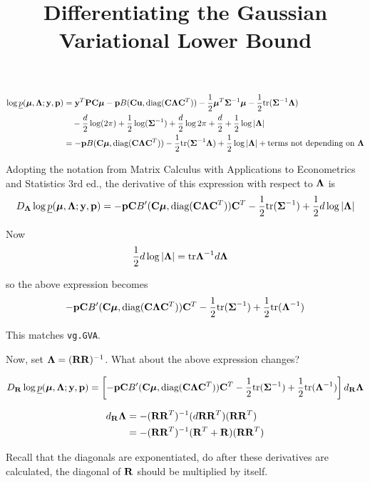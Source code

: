 \documentclass{article}[12pt]
\title{Differentiating the Gaussian Variational Lower Bound}
\begin{document}
\begin{align*}
\log \underline{p}({\boldsymbol \mu}, {\boldsymbol \Lambda}; {\bf y}, {\bf p}) &= {\bf y}^T {\bf P} {\bf C} {\boldsymbol \mu} - {\bf p} B({\bf C} {\bf u}, \text{diag}{({\bf C}{\boldsymbol\Lambda}{\bf C}^T)}) - {\frac{1}{2}} {\boldsymbol \mu}^T {\boldsymbol \Sigma}^{-1} {\boldsymbol \mu} - {\frac{1}{2}} \text{tr}{({\boldsymbol\Sigma}^{-1} {\boldsymbol\Lambda})} \\
&\quad - \frac{d}{2} \log(2 \pi) + {\frac{1}{2}} \log({\boldsymbol \Sigma}^{-1}) + \frac{d}{2} \log{2 \pi} + \frac{d}{2} + {\frac{1}{2}} \log |{\boldsymbol \Lambda}| \\
&= -{\bf p} B({\bf C} {\boldsymbol \mu}, \text{diag}{({\bf C}{\boldsymbol\Lambda}{\bf C}^T)}) - {\frac{1}{2}} \text{tr}{({\boldsymbol\Sigma}^{-1} {\boldsymbol\Lambda})} + {\frac{1}{2}} \log |{\boldsymbol \Lambda}| + \text{terms not depending on ${\boldsymbol \Lambda}$}
\end{align*}

Adopting the notation from Matrix Calculus with Applications to Econometrics and 
Statistics 3rd ed., the derivative of this expression with respect to ${\boldsymbol \Lambda}$ is
\[
D_{\boldsymbol \Lambda} \log \underline{p}({\boldsymbol \mu}, {\boldsymbol \Lambda}; {\bf y}, {\bf p}) = -{\bf p} {\bf C} B'({\bf C} {\boldsymbol \mu}, \text{diag}{({\bf C}{\boldsymbol\Lambda}{\bf C}^T)}) {\bf C}^T - {\frac{1}{2}} \text{tr}{({\boldsymbol\Sigma}^{-1})} + {\frac{1}{2}} d \log |{\boldsymbol \Lambda}|
\]

Now
\begin{align*}
{\frac{1}{2}} d \log |{\boldsymbol \Lambda}| &= \text{tr} {\boldsymbol\Lambda}^{-1} d {\boldsymbol \Lambda}
\end{align*}

so the above expression becomes
\begin{align*}
 -{\bf p} {\bf C} B'({\bf C} {\boldsymbol \mu}, \text{diag}{({\bf C}{\boldsymbol\Lambda}{\bf C}^T)}) {\bf C}^T - {\frac{1}{2}} \text{tr}{({\boldsymbol\Sigma}^{-1})} + {\frac{1}{2}} \text{tr}{({\boldsymbol\Lambda}^{-1})}
\end{align*}

This matches \texttt{vg.GVA}.

Now, set ${\boldsymbol \Lambda} = ({\bf R} {\bf R})^{-1}$. What about the above expression changes?

\[
D_{\bf R} \log \underline{p}({\boldsymbol \mu}, {\boldsymbol \Lambda}; {\bf y}, {\bf p}) = \left [ -{\bf p} {\bf C} B'({\bf C} {\boldsymbol \mu}, \text{diag}{({\bf C}{\boldsymbol\Lambda}{\bf C}^T)}) {\bf C}^T - {\frac{1}{2}} \text{tr}{({\boldsymbol\Sigma}^{-1})} + {\frac{1}{2}} \text{tr}{({\boldsymbol\Lambda}^{-1})} \right ] d_{\bf R} {\boldsymbol \Lambda}
\]

\begin{align*}
d_{\bf R} {\boldsymbol \Lambda} &= -({\bf R} {\bf R}^T)^{-1} (d{\bf R} {\bf R}^T) ({\bf R} {\bf R}^T) \\
&=-({\bf R} {\bf R}^T)^{-1} ({\bf R}^T + {\bf R}) ({\bf R} {\bf R}^T) \\
\end{align*}

Recall that the diagonals are exponentiated, do after these derivatives are calculated, the
diagonal of ${\bf R}$ should be multiplied by itself.
\end{document}

